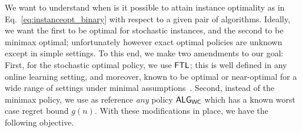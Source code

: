 We want to understand when is it possible to attain instance optimality as in Eq.~\eqref{eq:instanceopt_binary} with respect to a given pair of algorithms. Ideally, we want the first to be optimal for stochastic instances, and the second to be minimax optimal; unfortunately however exact optimal policies are unknown except in simple settings. To this end, we make two amendments to our goal: First, for the stochastic optimal policy, we use $\mathsf{FTL}$; this is well defined in any online learning setting, and moreover, known to be optimal or near-optimal for a wide range of settings under minimal assumptions~\citep{kotlowski2018minimaxity}. Second, instead of the minimax policy, we use as reference \emph{any} policy $\mathsf{ALG}_{\mathsf{WC}}$ which has a known worst case regret bound $g(n)$. With these modifications in place, we have the following objective.

